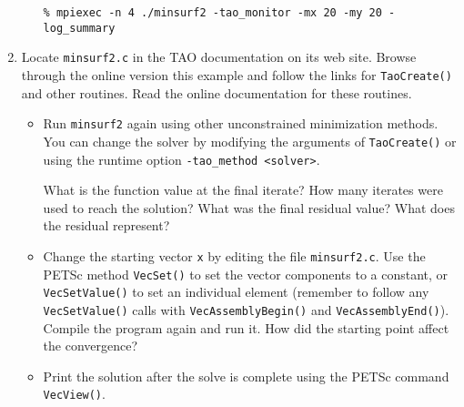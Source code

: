 \documentclass[11pt]{article}
\begin{document}
\begin{enumerate}
\begin{itemize}
\texttt{\% mpiexec -n 4 ./minsurf2 -tao\_monitor -mx 20 -my 20 -log\_summary}

\end{itemize}

\item 
  Locate \texttt{minsurf2.c} in the TAO documentation on its web site.  Browse through
  the online version this example and follow the links for
  \texttt{TaoCreate()} and other routines.  Read the online documentation for these routines.

\begin{itemize}
  \item 
  Run \texttt{minsurf2} again using other unconstrained minimization 
  methods.    You can change the solver by modifying the arguments of 
  \texttt{TaoCreate()} or using the runtime option \texttt{-tao\_method <solver>}.
 
  What is the function value at the final iterate?
  How many iterates were used to reach
  the solution?  What was the final residual value? What does the residual represent?

 \item 
  Change the starting vector \texttt{x} by editing the file \texttt{minsurf2.c}.  
  Use the PETSc method {\tt VecSet()}
  to set the vector components to a constant, or {\tt VecSetValue()} to set 
  an individual element (remember to follow any {\tt VecSetValue()} calls
  with {\tt VecAssemblyBegin()} and {\tt VecAssemblyEnd()}).  Compile the program again and run it.
  How did the starting point affect the convergence?

 \item Print the solution after the solve is complete using the PETSc command {\tt VecView()}.
\end{itemize}

\end{enumerate}
\end{document}
